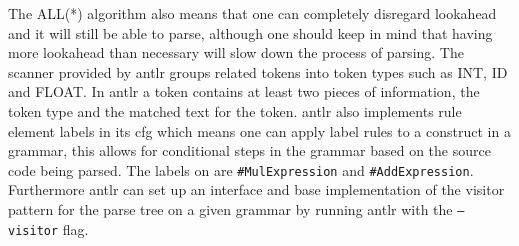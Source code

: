 The ALL(*) algorithm also means that one can completely disregard lookahead and it will still be able to parse, although one should keep in mind that having more lookahead than necessary will slow down the process of parsing.
The scanner provided by \acrshort{antlr} groups related tokens into token types such as INT, ID and FLOAT.
In \acrshort{antlr} a token contains at least two pieces of information, the token type and the matched text for the token.
\acrshort{antlr} also implements rule element labels in its \acrfull{cfg} which means one can apply label rules to a construct in a grammar, this allows for conditional steps in the grammar based on the source code being parsed.
The labels on  are \texttt{\#MulExpression} and \texttt{\#AddExpression}.
Furthermore \acrshort{antlr} can set up an interface and base implementation of the visitor pattern for the parse tree on a given grammar by running \acrshort{antlr} with the \texttt{--visitor} flag.\citep{ALLSTAR, LLSTAR, antlr4_Book}



